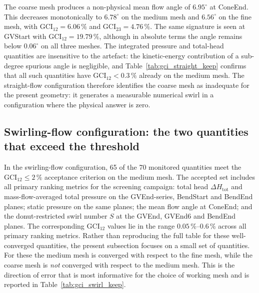 The coarse mesh produces a non-physical mean flow angle of $6.95^\circ$ at ConeEnd. This decreases monotonically to $6.78^\circ$ on the medium mesh and $6.56^\circ$ on the fine mesh, with $\mathrm{GCI}_{12} = 6.06\,\%$ and $\mathrm{GCI}_{23} = 4.76\,\%$. The same signature is seen at GVStart with $\mathrm{GCI}_{12} = 19.79\,\%$, although in absolute terms the angle remains below $0.06^\circ$ on all three meshes. The integrated pressure and total-head quantities are insensitive to the artefact: the kinetic-energy contribution of a sub-degree spurious angle is negligible, and Table~\ref{tab:gci_straight_keep} confirms that all such quantities have $\mathrm{GCI}_{12} < 0.3\,\%$ already on the medium mesh. The straight-flow configuration therefore identifies the coarse mesh as inadequate for the present geometry: it generates a measurable numerical swirl in a configuration where the physical answer is zero.

\subsection{Swirling-flow configuration: the two quantities that exceed the threshold}
\label{sec:gci_swirl}

In the swirling-flow configuration, 65 of the 70 monitored quantities meet the $\mathrm{GCI}_{12} \leq 2\,\%$ acceptance criterion on the medium mesh. The accepted set includes all primary ranking metrics for the screening campaign: total head $\Delta H_{\mathrm{tot}}$ and mass-flow-averaged total pressure on the GVEnd-series, BendStart and BendEnd planes; static pressure on the same planes; the mean flow angle at ConeEnd; and the donut-restricted swirl number $S$ at the GVEnd, GVEnd6 and BendEnd planes. The corresponding $\mathrm{GCI}_{12}$ values lie in the range $0.05\,\%$--$0.6\,\%$ across all primary ranking metrics. Rather than reproducing the full table for these well-converged quantities, the present subsection focuses on a small set of quantities. For these the medium mesh is converged with respect to the fine mesh, while the coarse mesh is \emph{not} converged with respect to the medium mesh. This is the direction of error that is most informative for the choice of working mesh and is reported in Table~\ref{tab:gci_swirl_keep}.

